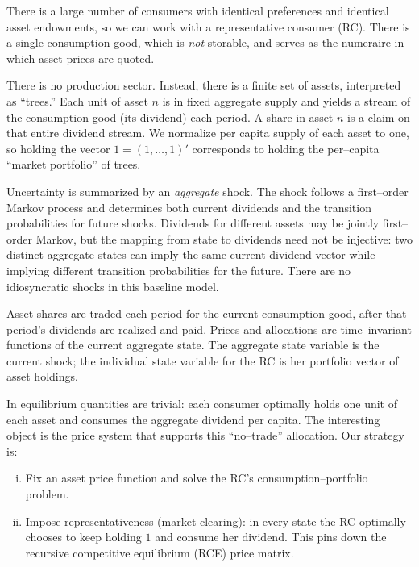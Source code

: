 \documentclass{tufte-handout}
\theoremstyle{definition}
\begin{document}
There is a large number of consumers with identical preferences and identical asset endowments, so we can work with a representative consumer (RC). There is a single consumption good, which is \emph{not} storable, and serves as the numeraire in which asset prices are quoted.

There is no production sector. Instead, there is a finite set of assets, interpreted as “trees.” Each unit of asset $n$ is in fixed aggregate supply and yields a stream of the consumption good (its dividend) each period. A share in asset $n$ is a claim on that entire dividend stream. We normalize per capita supply of each asset to one, so holding the vector $1 = (1,\ldots,1)'$ corresponds to holding the per–capita “market portfolio” of trees.

Uncertainty is summarized by an \emph{aggregate} shock. The shock follows a first–order Markov process and determines both current dividends and the transition probabilities for future shocks. Dividends for different assets may be jointly first–order Markov, but the mapping from state to dividends need not be injective: two distinct aggregate states can imply the same current dividend vector while implying different transition probabilities for the future. There are no idiosyncratic shocks in this baseline model.

Asset shares are traded each period for the current consumption good, after that period’s dividends are realized and paid. Prices and allocations are time–invariant functions of the current aggregate state. The aggregate state variable is the current shock; the individual state variable for the RC is her portfolio vector of asset holdings.

In equilibrium quantities are trivial: each consumer optimally holds one unit of each asset and consumes the aggregate dividend per capita. The interesting object is the price system that supports this “no–trade” allocation. Our strategy is:
\begin{enumerate}[(i)]
	\item Fix an asset price function and solve the RC’s consumption–portfolio problem.
	\item Impose representativeness (market clearing): in every state the RC optimally chooses to keep holding $1$ and consume her dividend. This pins down the recursive competitive equilibrium (RCE) price matrix.
\end{enumerate}
\end{document}
